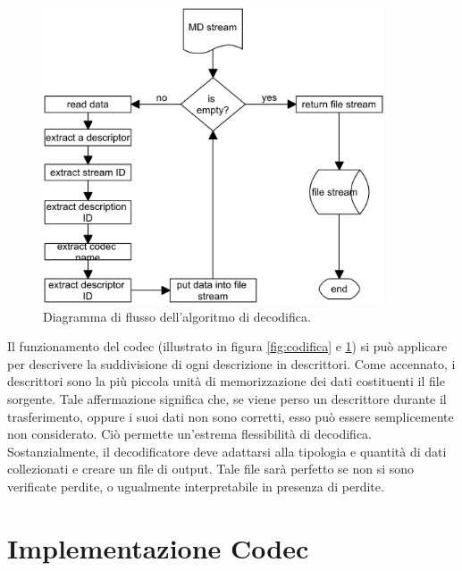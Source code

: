 \begin{figure}[ht]
\centering \includegraphics[width=0.90\textwidth]{../images/decodifica.png}
	\caption{Diagramma di flusso dell'algoritmo di decodifica.}
	\label{fig:decodifica}
\end{figure}

Il funzionamento del codec (illustrato in figura \ref{fig:codifica} e
\ref{fig:decodifica}) si può applicare per descrivere la suddivisione di ogni
descrizione in descrittori. Come accennato, i descrittori sono la più piccola unità di memorizzazione dei dati costituenti il file sorgente. Tale
affermazione significa che, se viene perso un descrittore durante il
trasferimento, oppure i suoi dati non sono corretti, esso può essere
semplicemente non considerato. Ciò permette un'estrema flessibilità di
decodifica. Sostanzialmente, il decodificatore deve adattarsi alla tipologia e
quantità di dati collezionati e creare un file di output. Tale file sarà perfetto se non si sono verificate perdite, o ugualmente interpretabile in presenza di perdite.


\section{Implementazione Codec}
